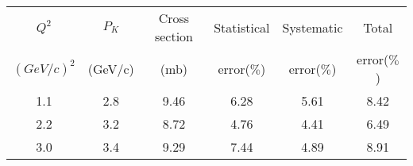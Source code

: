 \begin{center}
\begin{tabular}{||c|c|c|c|c|c||}\hline
 $Q^2$ & $P_K$ & Cross section & Statistical & Systematic & Total \\
 $(GeV/c)^2$ & (GeV/c)& (mb) & error($\%$)& error($\%$)&error($\%$) \\\hline
1.1 & 2.8& 9.46 & 6.28 & 5.61 & 8.42\\
2.2 & 3.2& 8.72 & 4.76 & 4.41 & 6.49\\
3.0 & 3.4& 9.29 & 7.44 & 4.89 & 8.91\\\hline
\end{tabular}
\end{center}